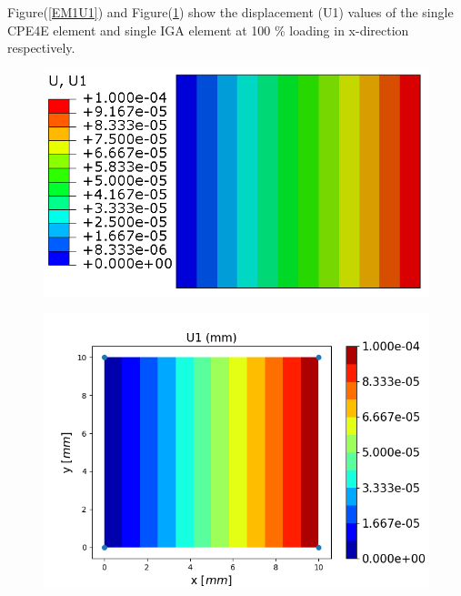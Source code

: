 \documentclass[11pt]{article}
\begin{document}
Figure(\ref{EM1U1}) and Figure(\ref{EM1U1_IGA}) show the displacement (U1) values of the single CPE4E element and single IGA element at 100 \% loading in x-direction respectively. \\
\begin{figure}[H]
	\centering
	\begin{minipage}{.5\textwidth}
		\centering
		\includegraphics[width=1\linewidth]{EM1U1.png}
		\label{EM1U1}
	\end{minipage}%
	\begin{minipage}{.6\textwidth}
		\centering
		\includegraphics[width=1\linewidth]{EM1U1_IGA.png}
		\label{EM1U1_IGA}
	\end{minipage}
\end{figure}
\end{document}
